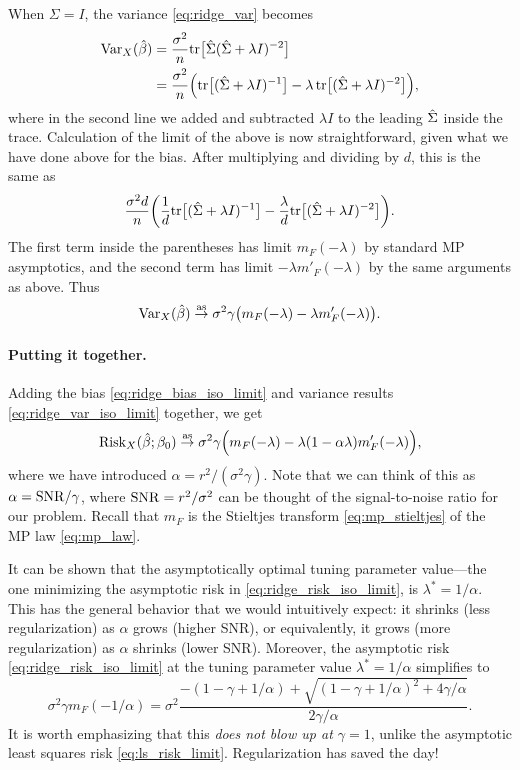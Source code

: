 \documentclass{article}
\begin{document}
When $\Sigma = I$, the variance \eqref{eq:ridge_var} becomes 
\begin{align*}
\mathrm{Var}_X(\hat{\beta})
&= \frac{\sigma^2}{n} \mathrm{tr} \big[ \hat\Sigma ( \hat\Sigma + \lambda I)^{-2} \big] \\ 
&=\frac{\sigma^2}{n} \Big( \mathrm{tr} \big[ ( \hat\Sigma + \lambda I)^{-1} \big] - 
\lambda \, \mathrm{tr} \big[ (\hat\Sigma + \lambda I)^{-2} \big] \Big),
\end{align*}
where in the second line we added and subtracted $\lambda I$ to the leading
$\hat\Sigma$ inside the trace. Calculation of the limit of the above is now
straightforward, given what we have done above for the bias. After multiplying 
and dividing by $d$, this is the same as 
\[
\frac{\sigma^2 d}{n} \bigg( \frac{1}{d} \mathrm{tr} \big[ ( \hat\Sigma + \lambda I)^{-1} 
\big] - \frac{\lambda}{d} \mathrm{tr} \big[ (\hat\Sigma + \lambda I)^{-2} \big] \bigg).  
\]
The first term inside the parentheses has limit $m_F(-\lambda)$ by standard MP
asymptotics, and the second term has limit $-\lambda m'_F(-\lambda)$ by the same
arguments as above. Thus   
\begin{equation}
\label{eq:ridge_var_iso_limit}
\mathrm{Var}_X(\hat{\beta}) \overset{\mathrm{as}}{\to} \sigma^2 \gamma \big( m_F(-\lambda) - \lambda 
m'_F(-\lambda) \big).
\end{equation}

\paragraph{Putting it together.}

Adding the bias \eqref{eq:ridge_bias_iso_limit} and variance results
\eqref{eq:ridge_var_iso_limit} together, we get
\begin{equation}
\label{eq:ridge_risk_iso_limit}
\mathrm{Risk}_X(\hat{\beta}; \beta_0) \overset{\mathrm{as}}{\to} \sigma^2 \gamma 
\Big( m_F(-\lambda) - \lambda (1 - \alpha \lambda) m'_F(-\lambda) \Big), 
\end{equation}
where we have introduced $\alpha = r^2 / (\sigma^2 \gamma)$. Note that we can
think of this as $\alpha = \mathrm{SNR} / \gamma$, where $\mathrm{SNR} = r^2 / \sigma^2$ can be 
thought of the signal-to-noise ratio for our problem. Recall that $m_F$ is the
Stieltjes transform \eqref{eq:mp_stieltjes} of the MP law \eqref{eq:mp_law}.

It can be shown that the asymptotically optimal tuning parameter value---the one
minimizing the asymptotic risk in \eqref{eq:ridge_risk_iso_limit}, is $\lambda^*
= 1/\alpha$. This has the general behavior that we would intuitively expect: it
shrinks (less regularization) as $\alpha$ grows (higher SNR), or equivalently,
it grows (more regularization) as $\alpha$ shrinks (lower SNR). Moreover, the
asymptotic risk \eqref{eq:ridge_risk_iso_limit} at the tuning parameter value
$\lambda^* = 1/\alpha$ simplifies to      
\[
\sigma^2 \gamma m_F(-1/\alpha) = \sigma^2 \frac{-(1 - \gamma + 1/\alpha) + 
  \sqrt{(1 - \gamma + 1/\alpha)^2 + 4\gamma / \alpha}}{2\gamma /\alpha}.     
\]
It is worth emphasizing that this \emph{does not blow up at $\gamma = 1$}, 
unlike the asymptotic least squares risk \eqref{eq:ls_risk_limit}. 
Regularization has saved the day! 
\end{document}
